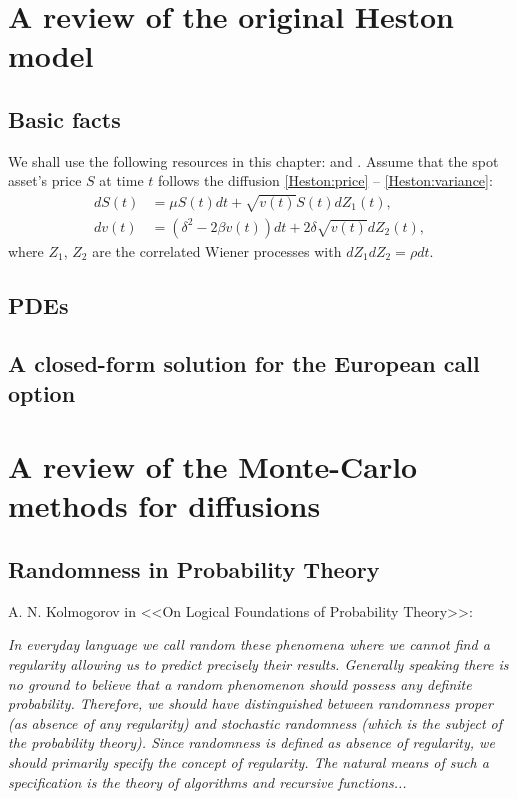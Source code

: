 \chapter{A review of the original Heston model}
    \section{Basic facts}
        We shall use the following resources in this chapter: \cite{Heston1993} and \cite{Gatheral2012}.
        Assume that the spot asset's price $S$ at time $t$ follows the diffusion \eqref{Heston:price} -- \eqref{Heston:variance}:
        \begin{align}
            dS(t) & = \mu S(t)dt + \sqrt{v(t)} S(t) dZ_1(t), \label{Heston:price}\\
            dv(t) & = \left(\delta^2 - 2\beta v(t)\right) dt + 2\delta \sqrt{v(t)} dZ_2(t), \label{Heston:variance}
        \end{align}
        where $Z_1$, $Z_2$ are the correlated Wiener processes with $dZ_1dZ_2 = \rho dt$.
    \section{PDEs}
    \section{A closed-form solution for the European call option}
\chapter{A review of the Monte-Carlo methods for diffusions}
    \section{Randomness in Probability Theory}
        A. N. Kolmogorov in <<On Logical Foundations of Probability Theory>>: 
        
        \textit {In everyday language we call random these phenomena where we cannot find a regularity allowing us to predict precisely their results. Generally speaking there is no ground to believe that a random phenomenon should possess any definite probability. Therefore, we should have distinguished between randomness proper
        (as absence of any regularity) and stochastic randomness (which is the subject of the probability theory).
        Since randomness is defined as absence of regularity, we should
        primarily specify the concept of regularity. The natural means of such a specification is the theory of algorithms and recursive functions...}

